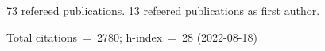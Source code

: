 73 refereed publications. 13 refeered publications as first author.

Total citations~=~2780; h-index~=~28 (2022-08-18)